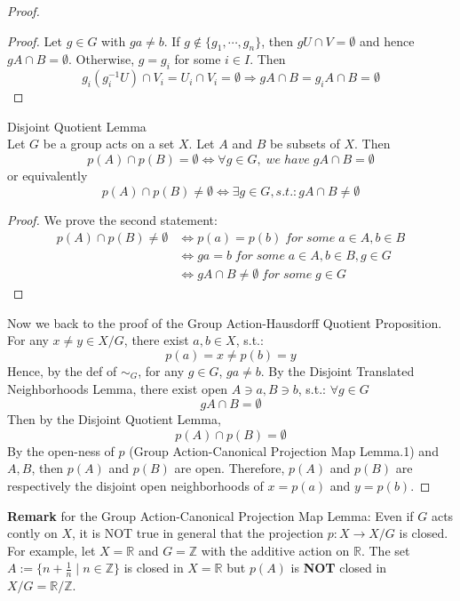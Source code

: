 \begin{proof}
\begin{proof}
        Let $g \in G$ with $ga\neq b$. If $g \notin \{g_1 ,\cdots, g_n\}$, then $gU \cap V =\emptyset$ and hence $gA \cap B =\emptyset$. Otherwise, $g=g_i$ for some $i \in I$. Then
        $$g_i(g_i^{-1}U) \cap V_i = U_i \cap V_i =\emptyset \Rightarrow gA\cap B= g_i A \cap B=\emptyset$$
    \end{proof}

    \begin{lemma}{Disjoint Quotient Lemma}\\
    Let $G$ be a group acts on a set $X$. Let $A$ and $B$ be subsets of $X$. Then
    $$p(A) \cap p(B) =\emptyset \Leftrightarrow \forall g \in G, \;we\;have\; gA \cap B=\emptyset$$
    or equivalently
    $$p(A) \cap p(B) \neq \emptyset \Leftrightarrow \exists g \in G, s.t.: gA \cap B \neq \emptyset$$
    \end{lemma}

    \begin{proof}
        We prove the second statement:
        \begin{align*}
            p(A) \cap p(B) \neq \emptyset &\Leftrightarrow p(a) = p(b) \;for\;some\; a\in A,b\in B\\
            &\Leftrightarrow ga=b \;for\;some\;a\in A,b\in B,g \in G\\
            &\Leftrightarrow g A\cap B \neq \emptyset \;for\;some\;g \in G
        \end{align*}
    \end{proof}

    Now we back to the proof of the Group Action-Hausdorff Quotient Proposition. For any $x \neq y \in X/G$, there exist $a,b \in X$, s.t.:
    $$p(a)=x  \neq p(b) =y$$
    Hence, by the def of $\sim_G$, for any $g \in G$, $ga \neq b$. By the Disjoint Translated Neighborhoods Lemma, there exist open $A\ni a,B\ni b$, s.t.: $\forall g \in G$
    $$gA \cap B= \emptyset $$
    Then by the Disjoint Quotient Lemma, 
    \begin{equation*}
        p(A) \cap p(B) =\emptyset \tag{*}
    \end{equation*}
    By the open-ness of $p$ (Group Action-Canonical Projection Map Lemma.1) and $A,B$, then $p(A)$ and $p(B)$ are open. Therefore, $p(A)$ and $p(B)$ are respectively the disjoint open neighborhoods of $x=p(a)$ and $y=p(b)$.
\end{proof}


\noindent\textbf{Remark} for the Group Action-Canonical Projection Map Lemma: Even if $G$ acts contly on $X$, it is NOT true in general that the projection $p: X \to X/G$ is closed. For example, let $X=\mathbb{R}$ and $G= \mathbb{Z}$ with the additive action on $\mathbb{R}$. The set $A:=\{ n+\frac{1}{n} \mid n \in \mathbb{Z} \}$ is closed in $X =\mathbb{R}$ but $p(A)$ is \textbf{NOT} closed in $X/G = \mathbb{R} / \mathbb{Z}$.










